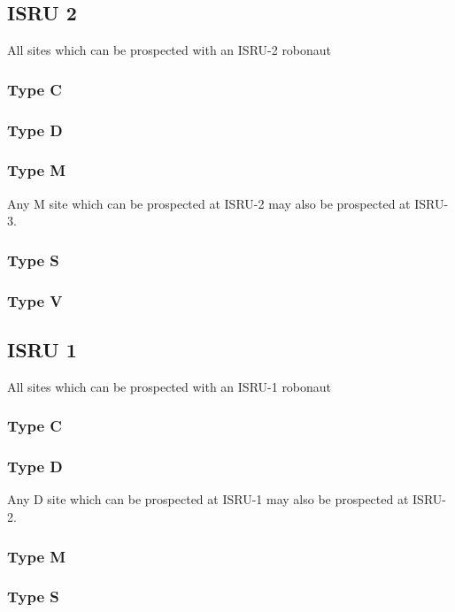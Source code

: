 \documentclass[a4paper,table,fontsize=8pt,DIV=6,enabledeprecatedfontcommands]{scrbook}
\begin{document}
\subsection{ISRU 2}
All sites which can be prospected with an ISRU-2 robonaut
\subsubsection{Type C}
\subsubsection{Type D}
\subsubsection{Type M}
Any M site which can be prospected at ISRU-2 may also be prospected at ISRU-3.
\subsubsection{Type S}
\subsubsection{Type V}

\pagebreak
\subsection{ISRU 1}
All sites which can be prospected with an ISRU-1 robonaut
\subsubsection{Type C}
\pagebreak
\subsubsection{Type D}
Any D site which can be prospected at ISRU-1 may also be prospected at ISRU-2.
\subsubsection{Type M}
\subsubsection{Type S}
\end{document}
